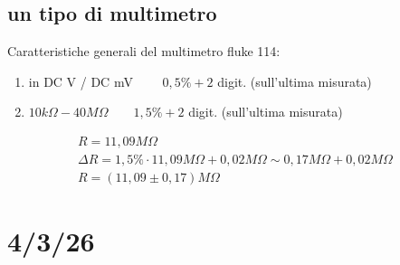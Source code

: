 \documentclass[a4paper, oneside]{article}
\begin{document}
    \subsection{un tipo di multimetro}
    Caratteristiche generali del multimetro fluke 114:
        \begin{enumerate}[1)]
            \item in DC V / DC mV $\qquad 0,5\% + 2$ digit. (sull'ultima misurata)
            \item $10 k \Omega - 40 M \Omega \qquad 1,5\% + 2$ digit. (sull'ultima misurata)
        \end{enumerate}
        \begin{example}
            \begin{gather*}
                R= 11,09 M\Omega\\
                \Delta R = 1,5 \% \cdot 11,09 M \Omega + 0,02 M \Omega \sim 0,17 M \Omega + 0,02 M \Omega\\
                R = (11,09 \pm 0,17) M \Omega
            \end{gather*}
        \end{example}
\newpage\noindent
\section{4/3/26}
\end{document}
